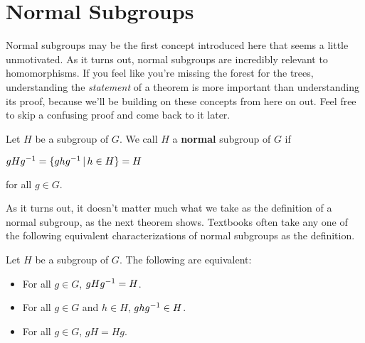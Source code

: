\section{Normal Subgroups}

Normal subgroups may be the first concept introduced here that seems a little unmotivated. As it turns out, normal subgroups are incredibly relevant to homomorphisms. If you feel like you're missing the forest for the trees, understanding the \textit{statement} of a theorem is more important than understanding its proof, because we'll be building on these concepts from here on out. Feel free to skip a confusing proof and come back to it later.

\begin{definition}
Let $H$ be a subgroup of $G$. We call $H$ a \textbf{normal} subgroup of $G$ if
\begin{center}
    $gHg^{-1} = \{ghg^{-1} \,|\, h \in H\} = H$
\end{center}
for all $g \in G$.
\end{definition}

As it turns out, it doesn't matter much what we take as the definition of a normal subgroup, as the next theorem shows. Textbooks often take any one of the following equivalent characterizations of normal subgroups as the definition.

\begin{theorem}
Let $H$ be a subgroup of $G$. The following are equivalent:
\begin{itemize}
\item For all $g \in G$, $gHg^{-1} = H$.
\item For all $g \in G$ and $h \in H$, $ghg^{-1} \in H$.
\item For all $g \in G$, $gH = Hg$.
\end{itemize}
\end{theorem}

